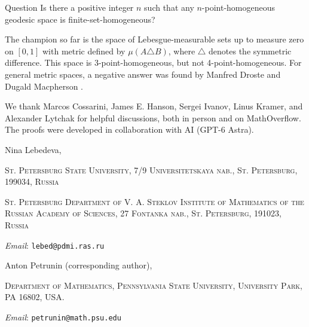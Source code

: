 \documentclass[a4paper,10pt]{article}
\makeatletter
\newcommand{\imrn}[2]{#2} %
\newcommand{\Addresses}{{\bigskip\footnotesize

\noindent Nina Lebedeva,
\par\nopagebreak
 \textsc{St. Petersburg State University, 7/9 Universitetskaya nab., St. Petersburg, 199034, Russia}
\par
\nopagebreak
 \textsc{St. Petersburg Department of V. A. Steklov Institute of Mathematics of the Russian Academy of Sciences, 27 Fontanka nab., St. Petersburg, 191023, Russia}
  \par\nopagebreak
  \textit{Email}: \texttt{lebed@pdmi.ras.ru}

\medskip

\noindent   Anton Petrunin (corresponding author),
\par\nopagebreak
 \textsc{Department of Mathematics, Pennsylvania State University,
University Park, PA 16802, USA.}
  \par\nopagebreak
  \textit{Email}: \texttt{petrunin@math.psu.edu}

}}
\makeatother
\begin{document}
\begin{thm}{Question}
Is there a positive integer $n$ such that any $n$-point-homogeneous  geodesic space is finite-set-homogeneous?
\end{thm}

The champion so far is the space of Lebesgue-measurable sets up to measure zero on $[0,1]$ with metric defined by $\mu(A\triangle B)$, where $\triangle$ denotes the symmetric difference.
This space is 3-point-homogeneous, but not 4-point-homogeneous.
For general metric spaces, a negative answer was found by Manfred Droste and Dugald Macpherson \cite{droste-macpherson}.




We thank Marcos Cossarini, James E. Hanson, Sergei Ivanov, Linus Kramer, and Alexander Lytchak for helpful discussions, both in person and on MathOverflow.
The proofs were developed in collaboration with AI (GPT-6 Astra).

{\sloppy
\def\emph{\textit}
\printbibliography[heading=bibintoc]\fussy}

\imrn{}{\Addresses}
\end{document}
